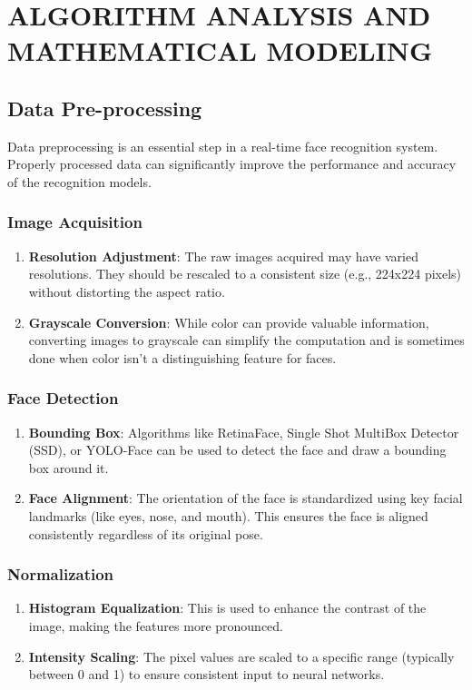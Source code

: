 \chapter{ALGORITHM ANALYSIS AND MATHEMATICAL MODELING}

\section{Data Pre-processing}
	Data preprocessing is an essential step in a real-time face recognition system. Properly processed data can significantly improve the performance and accuracy of the recognition models.

	\subsection{Image Acquisition}
		\begin{enumerate}
			\item \textbf{Resolution Adjustment}: The raw images acquired may have varied resolutions. They should be rescaled to a consistent size (e.g., 224x224 pixels) without distorting the aspect ratio. 
			\item \textbf{Grayscale Conversion}: While color can provide valuable information, converting images to grayscale can simplify the computation and is sometimes done when color isn't a distinguishing feature for faces.
		\end{enumerate}

	\subsection{Face Detection}
		\begin{enumerate}
			\item \textbf{Bounding Box}: Algorithms like RetinaFace, Single Shot MultiBox Detector (SSD), or YOLO-Face can be used to detect the face and draw a bounding box around it.
			\item \textbf{Face Alignment}: The orientation of the face is standardized using key facial landmarks (like eyes, nose, and mouth). This ensures the face is aligned consistently regardless of its original pose.
		\end{enumerate}

	\subsection{Normalization}
		\begin{enumerate}
			\item \textbf{Histogram Equalization}: This is used to enhance the contrast of the image, making the features more pronounced.
			\item \textbf{Intensity Scaling}: The pixel values are scaled to a specific range (typically between 0 and 1) to ensure consistent input to neural networks.
		\end{enumerate}

